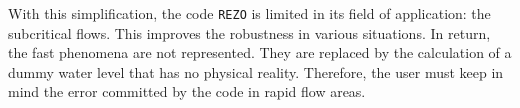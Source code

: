 With this simplification, the code \texttt{REZO} is limited in its field of application: the subcritical flows.
This improves the robustness in various situations. In return, the fast phenomena are not represented. They are replaced by the calculation of a dummy water level that has no physical reality.
Therefore, the user must keep in mind the error committed by the code in rapid flow areas.
